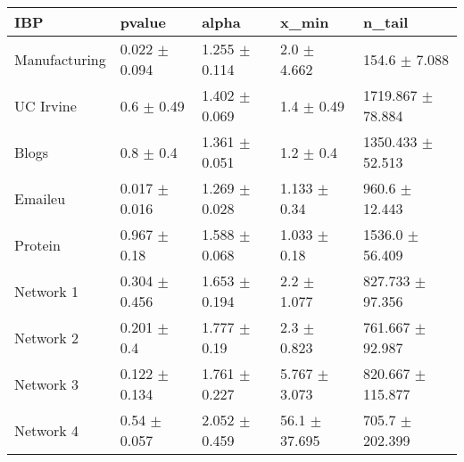 \begin{tabular}{@{}lllll@{}}
\toprule

\textbf{IBP} & pvalue & alpha & x\_min & n\_tail \\\midrule

Manufacturing & 0.022 \(\pm\) 0.094 & 1.255 \(\pm\) 0.114 & 2.0 \(\pm\)
4.662 & 154.6 \(\pm\) 7.088 \\
UC Irvine & 0.6 \(\pm\) 0.49 & 1.402 \(\pm\) 0.069 & 1.4 \(\pm\)
0.49 & 1719.867 \(\pm\) 78.884 \\
Blogs & 0.8 \(\pm\) 0.4 & 1.361 \(\pm\) 0.051 & 1.2 \(\pm\)
0.4 & 1350.433 \(\pm\) 52.513 \\
Emaileu & 0.017 \(\pm\) 0.016 & 1.269 \(\pm\) 0.028 & 1.133 \(\pm\)
0.34 & 960.6 \(\pm\) 12.443 \\
Protein & 0.967 \(\pm\) 0.18 & 1.588 \(\pm\) 0.068 & 1.033 \(\pm\)
0.18 & 1536.0 \(\pm\) 56.409 \\
Network 1 & 0.304 \(\pm\) 0.456 & 1.653 \(\pm\) 0.194 & 2.2 \(\pm\)
1.077 & 827.733 \(\pm\) 97.356 \\
Network 2 & 0.201 \(\pm\) 0.4 & 1.777 \(\pm\) 0.19 & 2.3 \(\pm\)
0.823 & 761.667 \(\pm\) 92.987 \\
Network 3 & 0.122 \(\pm\) 0.134 & 1.761 \(\pm\) 0.227 & 5.767 \(\pm\)
3.073 & 820.667 \(\pm\) 115.877 \\
Network 4 & 0.54 \(\pm\) 0.057 & 2.052 \(\pm\) 0.459 & 56.1 \(\pm\)
37.695 & 705.7 \(\pm\) 202.399 \\

\bottomrule
\end{tabular}
